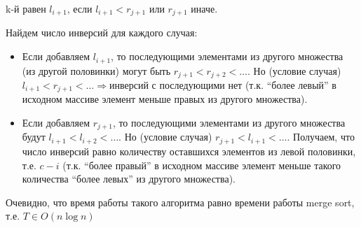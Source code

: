 \documentclass[a4paper]{article}
\begin{document}
  k-й равен $l_{i + 1}$, если $l_{i + 1} < r_{j + 1}$ или $r_{j +
  1}$ иначе.
  
  Найдем число инверсий для каждого случая:
  \begin{itemize}
    \item Если добавляем $l_{i + 1}$, то
    последующими элементами из другого
    множества (из другой половинки) могут
    быть $r_{j + 1} < r_{j + 2} < \ldots$. Но (условие
    случая) $l_{i + 1} < r_{j + 1} < \ldots \Rightarrow$инверсий
    с последующими нет (т.к. ``более левый'' в
    исходном массиве элемент меньше правых
    из другого множества).
    
    \item Если добавляем $r_{j + 1}$, то
    последующими элементами из другого
    множества будут $l_{i + 1} < l_{i + 2} < \ldots$. Но
    (условие случая) $r_{j + 1} < l_{i + 1} < \ldots$.
    Получаем, что число инверсий равно
    количеству оставшихся элементов из
    левой половинки, т.е. $c - i$ (т.к. ``более
    правый'' в исходном массиве элемент
    меньше такого количества ``более левых''
    из другого множества).
  \end{itemize}
  Очевидно, что время работы такого
  алгоритма равно времени работы merge sort, т.е.
  $T \in O \left( n \log n \right)$
\end{document}
